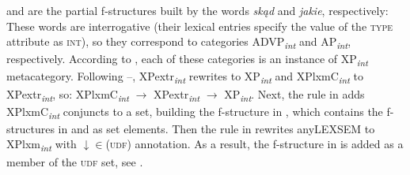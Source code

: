 \documentclass[output=paper]{../langscibook}
\begin{document}
 and
 are the partial
f-structures built by the words \emph{skąd} and \emph{jakie}, respectively:
\ea\label{ex:lexsem:wh:adjmain:adjobj:fstr:part:coord:C1}\z
{}
These words are interrogative (their lexical entries specify the value
of the \textsc{type} attribute as \textsc{int}), so they correspond to
categories ADVP\textsubscript{\textit{int}} and AP\textsubscript{\textit{int}}, respectively. According to
, each of these categories is an instance of
XP\textsubscript{\textit{int}} metacategory. Following
–, XPextr\textsubscript{\textit{int}} rewrites to XP\textsubscript{\textit{int}} and
XPlxmC\textsubscript{\textit{int}} to XPextr\textsubscript{\textit{int}}, so: XPlxmC\textsubscript{\textit{int}} $\longrightarrow$
XPextr\textsubscript{\textit{int}} $\longrightarrow$ XP\textsubscript{\textit{int}}. Next, the rule in
 adds XPlxmC\textsubscript{\textit{int}} conjuncts to a set,
building the f-structure in
, which contains the
f-structures in 
and  as set
elements.
%
Then the rule in  rewrites anyLEXSEM to XPlxm\textsubscript{\textit{int}}
with \textsc{$\downarrow\in$(\UP udf)} annotation. As a
result, the f-structure in
 is added as a
member of the \textsc{udf} set, see .
\end{document}
